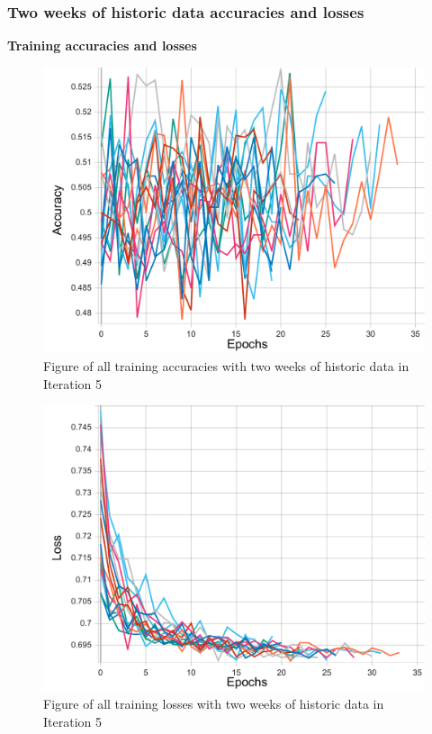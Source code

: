 \subsubsection{Two weeks of historic data accuracies and losses}
\textbf{Training accuracies and losses}
\begin{figure}[ht]
    \centering
    \includegraphics[width=0.575\columnwidth]{figures/results/final/two_weeks_acc_t.pdf}
    \caption[Training accuracies for Iteration 5 with two weeks of historic data]{Figure of all training accuracies with two weeks of historic data in Iteration 5}
    \label{fig:iteration5_two_weeks_train_accuracy}
\end{figure}

\FloatBarrier
\begin{figure}[ht]
    \centering
    \includegraphics[width=0.575\columnwidth]{figures/results/final/two_weeks_loss_t.pdf}
    \caption[Training losses for Iteration 5 with two weeks of historic data]{Figure of all training losses with two weeks of historic data in Iteration 5}
    \label{fig:iteration5_two_weeks_train_loss}
\end{figure}
\FloatBarrier

